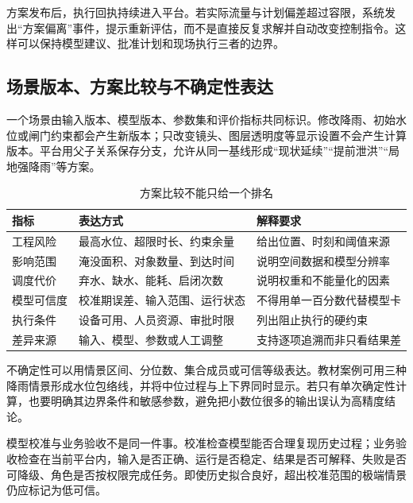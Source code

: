 方案发布后，执行回执持续进入平台。若实际流量与计划偏差超过容限，系统发出“方案偏离”事件，提示重新评估，而不是直接反复求解并自动改变控制指令。这样可以保持模型建议、批准计划和现场执行三者的边界。

\subsection{场景版本、方案比较与不确定性表达}

一个场景由输入版本、模型版本、参数集和评价指标共同标识。修改降雨、初始水位或闸门约束都会产生新版本；只改变镜头、图层透明度等显示设置不会产生计算版本。平台用父子关系保存分支，允许从同一基线形成“现状延续”“提前泄洪”“局地强降雨”等方案。

\begin{table}[htbp]
\centering
\caption{方案比较不能只给一个排名}
\label{tab:scenario-comparison}
\begin{tabular}{p{2.4cm}p{4.4cm}p{5.7cm}}
\toprule
指标 & 表达方式 & 解释要求 \\
\midrule
工程风险 & 最高水位、超限时长、约束余量 & 给出位置、时刻和阈值来源 \\
影响范围 & 淹没面积、对象数量、到达时间 & 说明空间数据和模型分辨率 \\
调度代价 & 弃水、缺水、能耗、启闭次数 & 说明权重和不能量化的因素 \\
模型可信度 & 校准期误差、输入范围、运行状态 & 不得用单一百分数代替模型卡 \\
执行条件 & 设备可用、人员资源、审批时限 & 列出阻止执行的硬约束 \\
差异来源 & 输入、模型、参数或人工调整 & 支持逐项追溯而非只看结果差 \\
\bottomrule
\end{tabular}
\end{table}

不确定性可以用情景区间、分位数、集合成员或可信等级表达。教材案例可用三种降雨情景形成水位包络线，并将中位过程与上下界同时显示。若只有单次确定性计算，也要明确其边界条件和敏感参数，避免把小数位很多的输出误认为高精度结论。

模型校准与业务验收不是同一件事。校准检查模型能否合理复现历史过程；业务验收检查在当前平台内，输入是否正确、运行是否稳定、结果是否可解释、失败是否可降级、角色是否按权限完成任务。即使历史拟合良好，超出校准范围的极端情景仍应标记为低可信。

